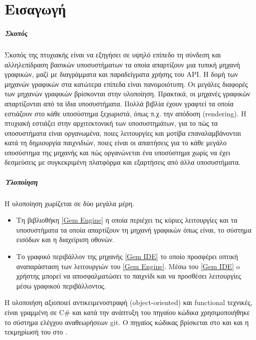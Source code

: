\chapter{Εισαγωγή}
	\paragraph{Σκοπός}
	Σκοπός της πτυχιακής είναι να εξηγήσει σε υψηλό επίπεδο τη σύνδεση και αλληλεπίδραση βασικών υποσυστήματων τα οποία απαρτίζουν μια
	τυπική μηχανή γραφικών, μαζί με διαγράμματα και παραδείγματα χρήσης του \gls{API}. 
	Η δομή των μηχανών γραφικών στα κατώτερα επίπεδα είναι πανομοιότυπη. Οι μεγάλες διαφορές των μηχανών γραφικών βρίσκονται στην υλοποίηση. Πρακτικά, οι μηχανές γραφικών απαρτίζονται από τα ίδια υποσυστήματα. Πολλά βιβλία έχουν γραφτεί τα οποία εστιάζουν στο κάθε υποσύστημα ξεχωριστά, όπως π.χ. την απόδοση (rendering).
	Η πτυχιακή εστιάζει στην αρχιτεκτονική των υποσυστημάτων, για το πώς τα υποσυστήματα είναι οργανωμένα, ποιες λειτουργίες και μοτίβα επαναλαμβάνονται κατά τη δημιουργία παιχνιδιών, ποιες είναι οι απαιτήσεις για το κάθε μεγάλο υποσύστημα της μηχανής και πώς οργανώνεται ένα υποσύστημα χωρίς να έχει δεσμεύσεις με συγκεκριμένη πλατφόρμα και εξαρτήσεις από άλλα υποσυστήματα.

	\paragraph{Υλοποίηση}
	Η υλοποίηση χωρίζεται σε δύο μεγάλα μέρη.	
	\begin{itemize}
		\item Τη βιβλιοθήκη \ref{Gem Engine} η οποία περιέχει τις κύριες λειτουργίες και τα υποσυστήματα τα οποία απαρτίζουν τη μηχανή γραφικών όπως είναι, το σύστημα εισόδων και η διαχείριση οθονών.
		\item Tο γραφικό περιβάλλον της μηχανής \ref{Gem IDE} το οποίο προσφέρει οπτική αναπαράσταση των λειτουργιών του \ref{Gem Engine}. Μέσω του \ref{Gem IDE} o χρήστης μπορεί να αποσφαλματώσει το παιχνίδι και να προσθέσει λειτουργίες μέσω γραφικού περιβάλλοντος.
	\end{itemize}
	H υλοποιήση αξιοποιεί αντικειμενοστραφή (object-oriented) και functional τεχνικές, είναι γραμμένη σε C\# και κατά την ανάπτυξη του πηγαίου κώδικα χρησιμοποιήθηκε το σύστημα ελέγχου αναθεωρήσεων git.  Ο πηγαίος κώδικας βρίσκεται στο \cite{gem} και \cite{ginet} και η τεκμηρίωσή του στο \cite{gemDocs}.	
	
